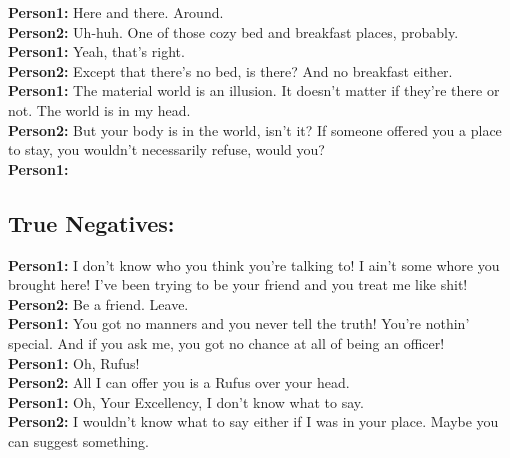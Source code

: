 \documentclass[
	letterpaper, %
	12pt, %
	unnumberedsections, %
	twoside, %
]{LTJournalArticle}
\begin{document}
\begin{appendices}
{		\noindent\textbf{Person1:}  Here and there. Around. \\
		\noindent\textbf{Person2:}  Uh-huh. One of those cozy bed and breakfast places, probably. \\
		\noindent\textbf{Person1:}  Yeah, that's right. \\
		\noindent\textbf{Person2:}  Except that there's no bed, is there? And no breakfast either. \\
		\noindent\textbf{Person1:}  The material world is an illusion. It doesn't matter if they're there or not. The world is in my head. \\
		\noindent\textbf{Person2:}  But your body is in the world, isn't it?  If someone offered you a place to stay, you wouldn't necessarily refuse, would you? \\
		\noindent\textbf{Person1:}  \\


	}

	\subsection{True Negatives:}
	{\ttfamily \tiny
		\noindent\textbf{Person1:}  I don't know who you think you're talking to! I ain't some whore you brought here! I've been trying to be your friend and you treat me like shit! \\
		\noindent\textbf{Person2:}  Be a friend. Leave. \\
		\noindent\textbf{Person1:}  You got no manners and you never tell the truth! You're nothin' special. And if you ask me, you got no chance at all of being an officer! \\

		\noindent\textbf{Person1:}  Oh, Rufus! \\
		\noindent\textbf{Person2:}  All I can offer you is a Rufus over your head. \\
		\noindent\textbf{Person1:}  Oh, Your Excellency, I don't know what to say. \\
		\noindent\textbf{Person2:}  I wouldn't know what to say either if I was in your place.  Maybe you can suggest something. \\


	}



\end{appendices}
%
\end{document}
